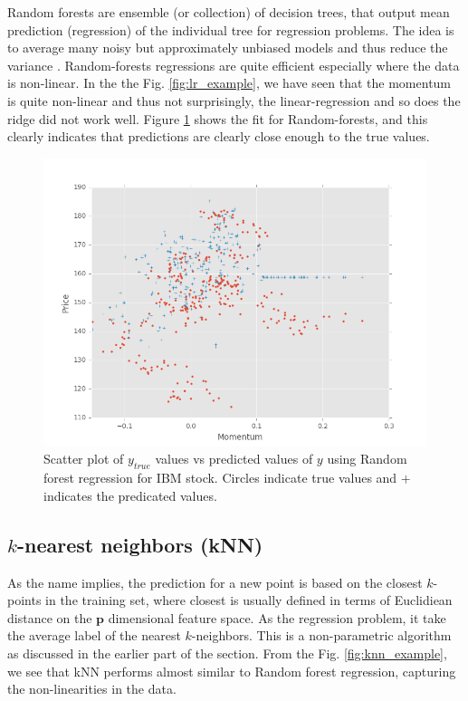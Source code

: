 \documentclass[12pt]{article}
\begin{document}
\begin{itemize}
Random forests are ensemble (or collection) of decision trees, that output mean prediction (regression) of the individual tree for regression problems. The idea is to average many noisy but approximately unbiased models and thus reduce the variance  \cite{ESL2}.  Random-forests regressions are quite efficient especially where the data is non-linear. In the the Fig. \ref{fig:lr_example}, we have seen that the momentum is quite non-linear and thus not surprisingly, the linear-regression and so does the ridge did not work well. Figure \ref{fig:rfr_example} shows the fit for Random-forests, and this clearly indicates that predictions are clearly close enough to the true values.

\begin{figure}[!htbp]
\begin{center}
\includegraphics[height=0.4\textheight,width=\textwidth]{rfr_momentum_fit.png}
\caption{Scatter plot of $y_{true}$ values vs predicted values of $y$ using Random forest regression for IBM stock. Circles indicate true values and $+$ indicates the predicated values. }
\label{fig:rfr_example}
\end{center}
\end{figure}


\subsection{$k$-nearest neighbors (kNN)}
\label{sec:knn}

As the name implies, the prediction for a new point is based on the closest $k$-points in the training set, where closest is usually defined in terms of Euclidiean distance on the $\mathbf{p}$ dimensional feature space. As the regression problem, it take the average label of the nearest $k$-neighbors. This is a non-parametric algorithm as discussed in the earlier part of the section. From the Fig. \ref{fig:knn_example}, we see that kNN performs almost similar to Random forest regression, capturing the non-linearities in the data.


\end{itemize}
\end{document}
